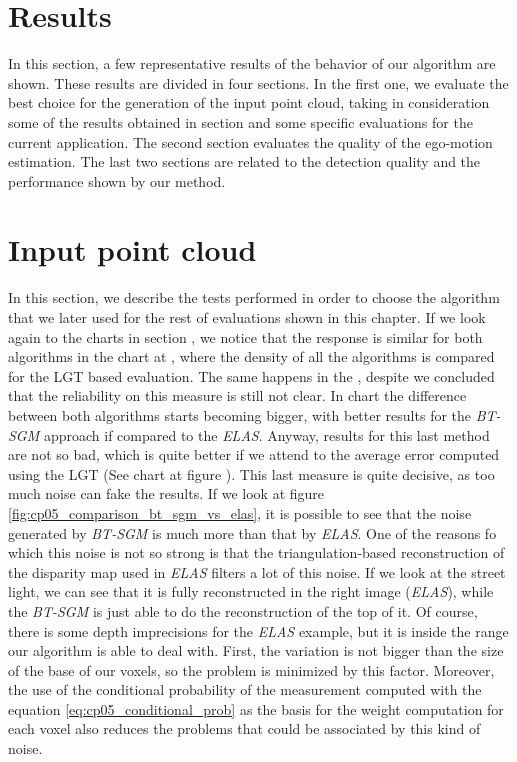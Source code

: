 \section{Results}\label{ch:chapter05_02}

In this section, a few representative results of the behavior of our algorithm are shown. These results are divided in four sections. In the first one, we evaluate the best choice for the generation of the input point cloud, taking in consideration some of the results obtained in section  and some specific evaluations for the current application. The second section evaluates the quality of the ego-motion estimation. The last two sections are related to the detection quality and the performance shown by our method.

\section{Input point cloud}\label{ch:chapter05_02_01}

In this section, we describe the tests performed in order to choose the algorithm that we later used for the rest of evaluations shown in this chapter. If we look again to the charts in section , we notice that the response is similar for both algorithms in the chart at , where the density of all the algorithms is compared for the \ac{LGT} based evaluation. The same happens in the , despite we concluded that the reliability on this measure is still not clear. In chart  the difference between both algorithms starts becoming bigger, with better results for the \emph{BT-SGM} approach if compared to the \emph{ELAS}. Anyway, results for this last method are not so bad, which is quite better if we attend to the average error computed using the \ac{LGT} (See chart at figure ). This last measure is quite decisive, as too much noise can fake the results. If we look at figure \ref{fig:cp05_comparison_bt_sgm_vs_elas}, it is possible to see that the noise generated by \emph{BT-SGM} is much more than that by \emph{ELAS}. One of the reasons fo which this noise is not so strong is that the triangulation-based reconstruction of the disparity map used in \emph{ELAS} filters a lot of this noise. If we look at the street light, we can see that it is fully reconstructed in the right image (\emph{ELAS}), while the \emph{BT-SGM} is just able to do the reconstruction of the top of it. Of course, there is some depth imprecisions for the \emph{ELAS} example, but it is inside the range our algorithm is able to deal with. First, the variation is not bigger than the size of the base of our voxels, so the problem is minimized by this factor. Moreover, the use of the conditional probability of the measurement computed with the equation \ref{eq:cp05_conditional_prob} as the basis for the weight computation for each voxel also reduces the problems that could be associated by this kind of noise.


